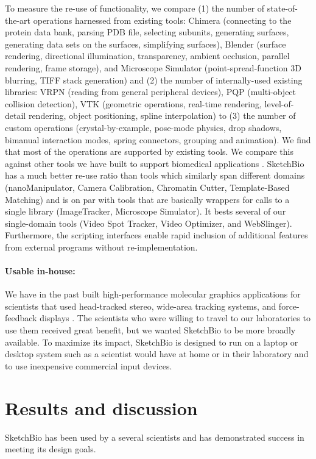 \documentclass[twocolumn]{bmcart}%
\begin{document}
To measure the re-use of functionality, we compare (1) the number of state-of-the-art operations harnessed from existing tools: Chimera (connecting to the protein data bank, parsing PDB file, selecting subunits, generating surfaces, generating data sets on the surfaces, simplifying surfaces), Blender (surface rendering, directional illumination, transparency, ambient occlusion, parallel rendering, frame storage), and Microscope Simulator (point-spread-function 3D blurring, TIFF stack generation) and (2) the number of internally-used existing libraries: VRPN (reading from general peripheral devices), PQP (multi-object collision detection), VTK (geometric operations, real-time rendering, level-of-detail rendering, object positioning, spline interpolation) to (3) the number of custom operations (crystal-by-example, pose-mode physics, drop shadows, bimanual interaction modes, spring connectors, grouping and animation).  We find that most of the operations are supported by existing tools.
We compare this against other tools we have built to support biomedical applications \cite{CISMMapps}. SketchBio has a much better re-use ratio than tools which similarly span different domains (nanoManipulator, Camera Calibration, Chromatin Cutter, Template-Based Matching) and is on par with tools that are basically wrappers for calls to a single library (ImageTracker, Microscope Simulator).  It bests several of our single-domain tools (Video Spot Tracker, Video Optimizer, and WebSlinger).
Furthermore, the scripting interfaces enable rapid inclusion of additional features from external programs without re-implementation.

\paragraph*{Usable in-house:} We have in the past built high-performance molecular graphics applications for scientists that used head-tracked stereo, wide-area tracking systems, and force-feedback displays \cite{Arthur,Grant1998,Marshburn2005,Taylor1999,Taylor1997,Taylor1993}.
The scientists who were willing to travel to our laboratories to use them received great benefit, but we wanted SketchBio to be more broadly available.
To maximize its impact, SketchBio is designed to run on a laptop or desktop system such as a scientist would have at home or in their laboratory and to use inexpensive commercial input devices.

\section*{Results and discussion}
SketchBio has been used by a several scientists and has demonstrated success in meeting its design goals.
\end{document}
